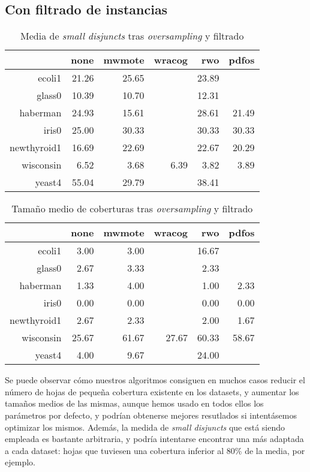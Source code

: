 \subsection{Con filtrado de instancias}
  \begin{table}[H]
  \centering
\begin{tabular}{rrrrrr}
  \hline
  & none & mwmote & wracog & rwo & pdfos \\ 
  \hline
  ecoli1 & 21.26 & 25.65 &  & 23.89 &  \\ 
  glass0 & 10.39 & 10.70 &  & 12.31 &  \\ 
  haberman & 24.93 & 15.61 &  & 28.61 & 21.49 \\ 
  iris0 & 25.00 & 30.33 &  & 30.33 & 30.33 \\ 
  newthyroid1 & 16.69 & 22.69 &  & 22.67 & 20.29 \\ 
  wisconsin & 6.52 & 3.68 & 6.39 & 3.82 & 3.89 \\ 
  yeast4 & 55.04 & 29.79 &  & 38.41 &  \\ 
  \hline
  \end{tabular}
  \caption{Media de \textit{small disjuncts} tras \textit{oversampling} y filtrado}
  \end{table}

  \begin{table}[H]
  \centering
  \begin{tabular}{rrrrrr}
  \hline
  & none & mwmote & wracog & rwo & pdfos \\ 
  \hline
  ecoli1 & 3.00 & 3.00 &  & 16.67 &  \\ 
  glass0 & 2.67 & 3.33 &  & 2.33 &  \\ 
  haberman & 1.33 & 4.00 &  & 1.00 & 2.33 \\ 
  iris0 & 0.00 & 0.00 &  & 0.00 & 0.00 \\ 
  newthyroid1 & 2.67 & 2.33 &  & 2.00 & 1.67 \\ 
  wisconsin & 25.67 & 61.67 & 27.67 & 60.33 & 58.67 \\ 
  yeast4 & 4.00 & 9.67 &  & 24.00 &  \\ 
  \hline
  \end{tabular}
  \caption{Tamaño medio de coberturas tras \textit{oversampling} y filtrado}
  \end{table}
  
  Se puede observar cómo nuestros algoritmos consiguen en muchos casos reducir el número de hojas de pequeña 
  cobertura existente en los datasets, y aumentar los tamaños medios de las mismas, aunque hemos usado en todos ellos
  los parámetros por defecto, y podrían obtenerse mejores resutlados si intentásemos optimizar los mismos. Además, la medida
  de \textit{small disjuncts} que está siendo empleada es bastante arbitraria, y podría intentarse encontrar una más
  adaptada a cada dataset: hojas que tuviesen una cobertura inferior al 80\% de la media, por ejemplo.
 